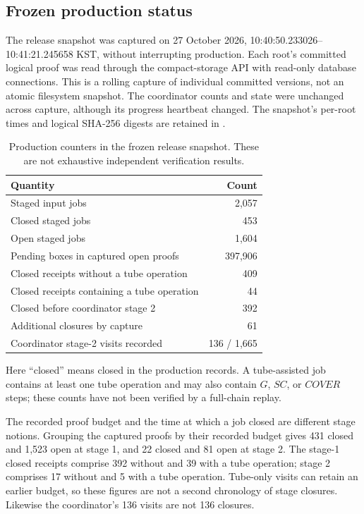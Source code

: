 \subsection{Frozen production status}
The release snapshot was captured on 27 October 2026,
10:40:50.233026--10:41:21.245658 KST, without interrupting production.
Each root's committed logical proof was read through the compact-storage
API with read-only database connections. This is a rolling capture of
individual committed versions, not an atomic filesystem snapshot. The
coordinator counts and state were unchanged across capture, although its
progress heartbeat changed. The snapshot's per-root times and logical
SHA-256 digests are retained in .

\begin{table}[ht]
\centering\small
\caption{Production counters in the frozen release snapshot. These are
not exhaustive independent verification results.}
\label{tab:counts}
\begin{tabular}{@{}p{}r@{}}
\toprule
Quantity & Count\\
\midrule
Staged input jobs & 2,057\\
Closed staged jobs & 453\\
Open staged jobs & 1,604\\
Pending boxes in captured open proofs & 397,906\\
Closed receipts without a tube operation & 409\\
Closed receipts containing a tube operation & 44\\
Closed before coordinator stage 2 & 392\\
Additional closures by capture & 61\\
Coordinator stage-2 visits recorded & 136 / 1,665\\
\bottomrule
\end{tabular}
\end{table}

Here ``closed'' means closed in the production records. A tube-assisted
job contains at least one tube operation and may also contain $G$, $SC$,
or $COVER$ steps; these counts have not been verified by a full-chain
replay.

The recorded proof budget and the time at which a job closed are different
stage notions. Grouping the captured proofs by their recorded budget
gives 431 closed and 1,523 open at stage 1, and 22 closed and 81 open at
stage 2. The stage-1 closed receipts comprise 392 without and 39 with a
tube operation; stage 2 comprises 17 without and 5 with a tube operation.
Tube-only visits can retain an earlier budget, so these figures are not a
second chronology of stage closures. Likewise the coordinator's
136 visits are not 136 closures.

